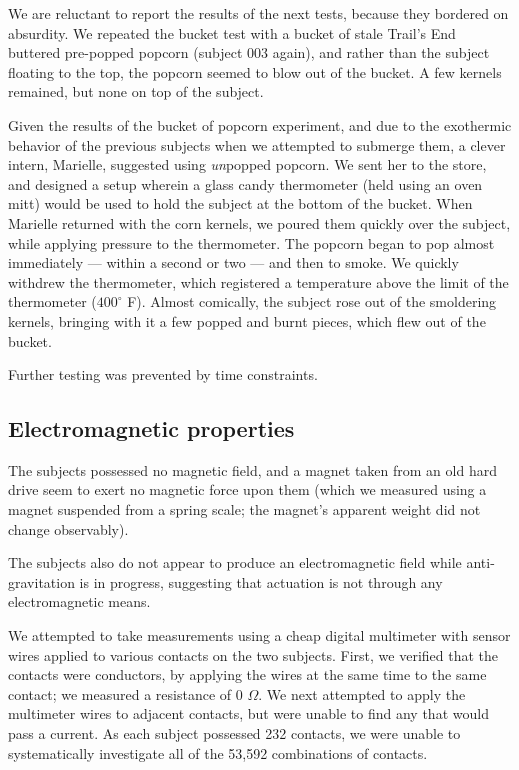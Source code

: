 \documentclass[10pt]{article}
\begin{document}
We are reluctant to report the results of the next tests, because they bordered on absurdity.
We repeated the bucket test with a bucket of stale Trail's End buttered pre-popped popcorn (subject 003 again), and rather than the subject floating to the top, the popcorn seemed to blow out of the bucket.
A few kernels remained, but none on top of the subject.

Given the results of the bucket of popcorn experiment, and due to the exothermic behavior of the previous subjects when we attempted to submerge them, a clever intern, Marielle, suggested using \textit{un}popped popcorn.
We sent her to the store, and designed a setup wherein a glass candy thermometer (held using an oven mitt) would be used to hold the subject at the bottom of the bucket.
When Marielle returned with the corn kernels, we poured them quickly over the subject, while applying pressure to the thermometer.
The popcorn began to pop almost immediately --- within a second or two --- and then to smoke.
We quickly withdrew the thermometer, which registered a temperature above the limit of the thermometer ($400^\circ$ F).
Almost comically, the subject rose out of the smoldering kernels, bringing with it a few popped and burnt pieces, which flew out of the bucket.


Further testing was prevented by time constraints.

\subsection{Electromagnetic properties}

The subjects possessed no magnetic field, and a magnet taken from an old hard drive seem to exert no magnetic force upon them (which we measured using a magnet suspended from a spring scale; the magnet's apparent weight did not change observably).

The subjects also do not appear to produce an electromagnetic field while anti-gravitation is in progress, suggesting that actuation is not through any electromagnetic means.

We attempted to take measurements using a cheap digital multimeter with sensor wires applied to various contacts on the two subjects.
First, we verified that the contacts were conductors, by applying the wires at the same time to the same contact; we measured a resistance of 0 $\Omega$.
We next attempted to apply the multimeter wires to adjacent contacts, but were unable to find any that would pass a current.
As each subject possessed 232 contacts, we were unable to systematically investigate all of the 53,592 combinations of contacts.
\end{document}
